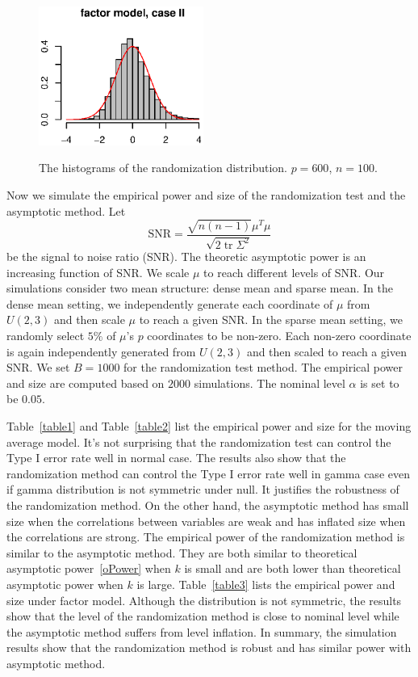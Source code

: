 \documentclass[3p]{elsarticle}
\DeclareMathOperator{\mytr}{tr}
\theoremstyle{plain}
\theoremstyle{definition}
\theoremstyle{remark}
\begin{document}
\begin{figure}[htbp]
    \includegraphics[width=0.48\textwidth]{Fig7}\\
    \caption{The histograms of the randomization distribution. $p=600$, $n=100$.}\label{figure:histogram}
\end{figure}




Now we simulate the empirical power and size of the randomization test and the asymptotic method.
Let 
\begin{equation*}
    \mathrm{SNR}=\frac{\sqrt{n(n-1)}\mu^T \mu}{\sqrt{2\mytr \Sigma^2}}
\end{equation*}
be the signal to noise ratio (SNR).
The theoretic asymptotic power is an increasing function of SNR\@.
We scale $\mu$ to reach different levels of SNR\@.
Our simulations consider two mean structure: dense mean and sparse mean.
In the dense mean setting,  we independently generate each coordinate of $\mu$ from $U(2,3)$ and then scale $\mu$ to reach a given SNR\@.
In the sparse mean setting, we randomly select $5\%$ of $\mu$'s $p$ coordinates to be non-zero.
Each non-zero coordinate is again independently generated from $U(2,3)$ and then scaled to reach a given SNR\@.
We set $B=1000$ for the randomization test method.
The empirical power and size are computed based on $2000$ simulations.
The nominal level $\alpha$ is set to be $0.05$.

Table~\ref{table1} and Table~\ref{table2} list the empirical power and size for the moving average model.
It's not surprising that the randomization test can  control the Type I error rate well in normal case.
The results also show that the randomization method can control the Type I error rate well in gamma case even if gamma distribution is not symmetric under null.
It justifies the robustness of the randomization method.
On the other hand, the asymptotic method has small size when the correlations between variables are weak and has inflated size when the correlations are strong.
The empirical power of the randomization method is similar to the asymptotic method.
They are both similar to theoretical asymptotic power~\eqref{oPower} when $k$ is small and are both lower than theoretical asymptotic power when $k$ is large.
Table~\ref{table3} lists the empirical power and size under factor model.
Although the distribution is not symmetric, the results show that the level of the randomization method is close to nominal level while the asymptotic method suffers from level inflation.
In summary, the simulation results show that the randomization method is robust and has similar power with asymptotic method.
\end{document}

